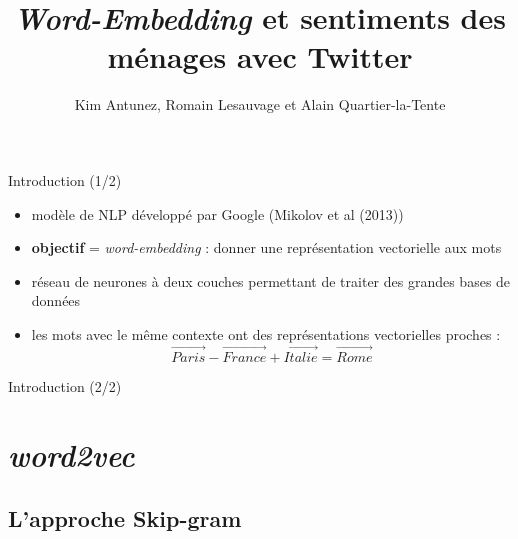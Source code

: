 \documentclass[10pt,xcolor=table,color={dvipsnames,usenames},ignorenonframetext,usepdftitle=false,french]{beamer}
\title{\emph{Word-Embedding} et sentiments des ménages avec Twitter}
\author{Kim Antunez, Romain Lesauvage et Alain Quartier-la-Tente}
\date{}
\begin{document}
\begin{frame}
\titlepage
\end{frame}

\begin{frame}{Introduction (1/2)}
\protect\hypertarget{introduction-12}{}

\begin{itemize}
\item
  modèle de NLP développé par Google (Mikolov et al (2013))
\item
  \textbf{objectif} = \emph{word-embedding} : donner une représentation
  vectorielle aux mots
\end{itemize}

\pause

\begin{itemize}
\item
  \bcloupe réseau de neurones à deux couches permettant de traiter des
  grandes bases de données \pause
\item
  les mots avec le même contexte ont des représentations vectorielles
  proches : \[
  \overrightarrow{Paris} - \overrightarrow{France} + \overrightarrow{Italie} = \overrightarrow{Rome}
  \]
\end{itemize}

\end{frame}

\begin{frame}{Introduction (2/2)}
\protect\hypertarget{introduction-22}{}

\resizebox{\textwidth}{!}{}

\end{frame}

\hypertarget{word2vec}{%
\section{\texorpdfstring{\emph{word2vec}}{word2vec}}\label{word2vec}}

\hypertarget{lapproche-skip-gram}{%
\subsection{L’approche Skip-gram}\label{lapproche-skip-gram}}
\end{document}

